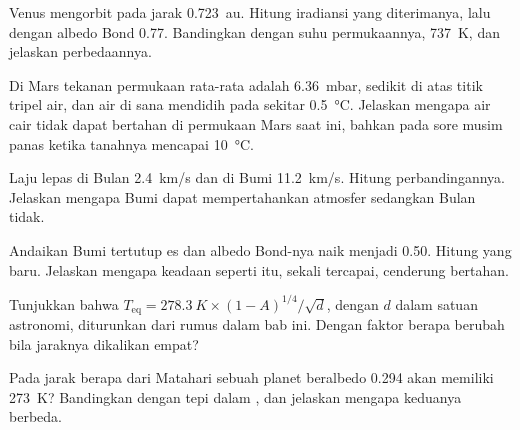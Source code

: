 \begin{exercise}[$\star\star$]\label{exo:g10:habitable-planet:8}
Venus mengorbit pada jarak \qty{0.723}{au}. Hitung iradiansi yang diterimanya,
lalu  dengan albedo Bond 0.77. Bandingkan dengan suhu
permukaannya, \qty{737}{K}, dan jelaskan perbedaannya.
\end{exercise}

\begin{exercise}[$\star\star$]\label{exo:g10:habitable-planet:9}
Di Mars tekanan permukaan rata-rata adalah \qty{6.36}{mbar}, sedikit di atas
titik tripel air, dan air di sana mendidih pada sekitar
\qty{0.5}{\degreeCelsius}. Jelaskan mengapa air cair tidak dapat bertahan di
permukaan Mars saat ini, bahkan pada sore musim panas ketika tanahnya mencapai
\qty{10}{\degreeCelsius}.
\end{exercise}

\begin{exercise}[$\star\star$]\label{exo:g10:habitable-planet:10}
Laju lepas di Bulan \qty{2.4}{km/s} dan di Bumi \qty{11.2}{km/s}. Hitung
perbandingannya. Jelaskan mengapa Bumi dapat mempertahankan atmosfer
sedangkan Bulan tidak.
\end{exercise}

\begin{exercise}[$\star\star$]\label{exo:g10:habitable-planet:11}
Andaikan Bumi tertutup es dan albedo Bond-nya naik menjadi 0.50. Hitung  yang baru. Jelaskan mengapa keadaan seperti itu, sekali
tercapai, cenderung bertahan.
\end{exercise}

\begin{exercise}[$\star\star\star$]\label{exo:g10:habitable-planet:12}
Tunjukkan bahwa $T_{\mathrm{eq}} = \qty{278.3}{K} \times (1-A)^{1/4}/\sqrt{d}$,
dengan $d$ dalam satuan astronomi, diturunkan dari rumus dalam bab ini.
Dengan faktor berapa  berubah bila jaraknya dikalikan empat?
\end{exercise}

\begin{exercise}[$\star\star\star$]\label{exo:g10:habitable-planet:13}
Pada jarak berapa dari Matahari sebuah planet beralbedo 0.294 akan memiliki
 \qty{273}{K}? Bandingkan dengan tepi dalam ,
dan jelaskan mengapa keduanya berbeda.
\end{exercise}

